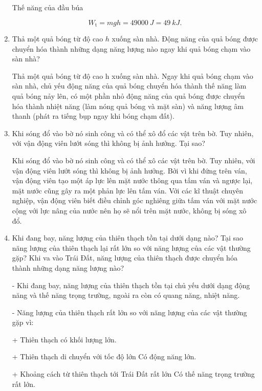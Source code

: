 \begin{enumerate}[label=\bfseries Câu \arabic*:]
	\hideall
	{	
		Thế năng của đầu búa
		
		$$W_\text{t} = mgh = \SI{49000}{J} = \SI{49}{kJ}.$$
	}
	\item {}
	
	
	{
		Thả một quả bóng từ độ cao $h$ xuống sàn nhà. Động năng của quả bóng được chuyển hóa thành những dạng năng lượng nào ngay khi quả bóng chạm vào sàn nhà?
	}
	
	\hideall
	{	
		Thả một quả bóng từ độ cao h xuống sàn nhà. Ngay khi quả bóng chạm vào sàn nhà, chủ yếu động năng của quả bóng chuyển hóa thành thế năng làm quả bóng nảy lên, có một phần nhỏ động năng của quả bóng được chuyển hóa thành nhiệt năng (làm nóng quả bóng và mặt sàn) và năng lượng âm thanh (phát ra tiếng bụp ngay khi bóng chạm đất).
		
		
	}
		\item {}
	
	
	{
		Khi sóng đổ vào bờ nó sinh công và có thể xô đổ các vật trên bờ. Tuy nhiên, với vận động viên lướt sóng thì không bị ảnh hưởng. Tại sao?
	}
	
	\hideall
	{	
		Khi sóng đổ vào bờ nó sinh công và có thể xô các vật trên bờ. Tuy nhiên, với vận động viên lướt sóng thì không bị ảnh hưởng. Bởi vì khi đứng trên ván, vận động viên tạo một áp lực lên mặt nước thông qua tấm ván và ngược lại, mặt nước cũng gây ra một phản lực lên tấm ván. Với các kĩ thuật chuyên nghiệp, vận động viên biết điều chỉnh góc nghiêng giữa tấm ván với mặt nước cộng với lực nâng của nước nên họ sẽ nổi trên mặt nước, không bị sóng xô đổ.
	}
	\item {}
	
	
	{
		Khi đang bay, năng lượng của thiên thạch tồn tại dưới dạng nào? Tại sao năng lượng của thiên thạch lại rất lớn so với năng lượng của các vật thường gặp? Khi va vào Trái Đất, năng lượng của thiên thạch được chuyển hóa thành những dạng năng lượng nào?
	}
	
	\hideall
	{	
		- Khi đang bay, năng lượng của thiên thạch tồn tại chủ yếu dưới dạng động năng và thế năng trọng trường, ngoài ra còn có quang năng, nhiệt năng.
		
		- Năng lượng của thiên thạch rất lớn so với năng lượng của các vật thường gặp vì:
		
		+ Thiên thạch có khối lượng lớn.
		
		+ Thiên thạch di chuyển với tốc độ lớn  Có động năng lớn.
		
		+ Khoảng cách từ thiên thạch tới Trái Đất rất lớn  Có thế năng trọng trường rất lớn.
		
}
\end{enumerate}
